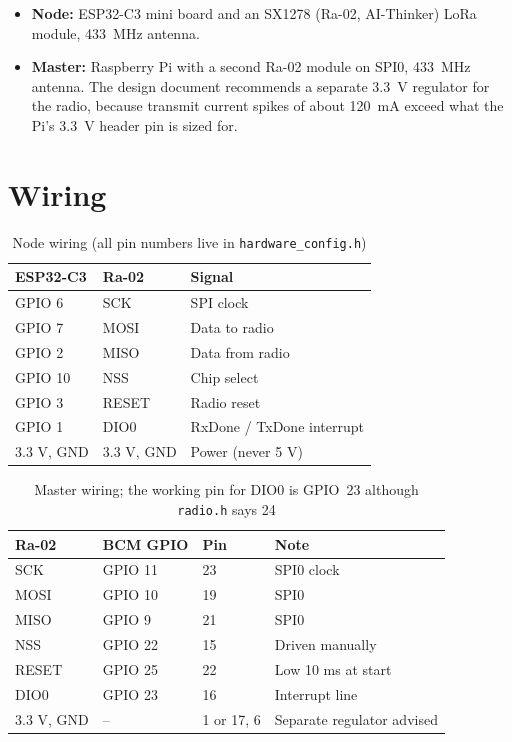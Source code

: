 \documentclass{tietreport}
\begin{document}
\begin{itemize}
  \item \textbf{Node:} ESP32-C3 mini board and an SX1278 (Ra-02,
    AI-Thinker) LoRa module, 433~MHz antenna.
  \item \textbf{Master:} Raspberry Pi with a second Ra-02 module on
    SPI0, 433~MHz antenna. The design document recommends a
    separate 3.3~V regulator for the radio, because transmit current
    spikes of about 120~mA exceed what the Pi's 3.3~V header pin is
    sized for.
\end{itemize}

\section{Wiring}

\begin{table}[h]
\centering
\small
\begin{tabular}{|l|l|l|}
  \hline
  \textbf{ESP32-C3} & \textbf{Ra-02} & \textbf{Signal} \\
  \hline
  GPIO 6 & SCK & SPI clock \\
  \hline
  GPIO 7 & MOSI & Data to radio \\
  \hline
  GPIO 2 & MISO & Data from radio \\
  \hline
  GPIO 10 & NSS & Chip select \\
  \hline
  GPIO 3 & RESET & Radio reset \\
  \hline
  GPIO 1 & DIO0 & RxDone / TxDone interrupt \\
  \hline
  3.3 V, GND & 3.3 V, GND & Power (never 5 V) \\
  \hline
\end{tabular}
\caption{Node wiring (all pin numbers live in \texttt{hardware\_config.h})}
\end{table}

\begin{table}[h]
\centering
\small
\begin{tabular}{|l|l|l|l|}
  \hline
  \textbf{Ra-02} & \textbf{BCM GPIO} & \textbf{Pin} & \textbf{Note} \\
  \hline
  SCK & GPIO 11 & 23 & SPI0 clock \\
  \hline
  MOSI & GPIO 10 & 19 & SPI0 \\
  \hline
  MISO & GPIO 9 & 21 & SPI0 \\
  \hline
  NSS & GPIO 22 & 15 & Driven manually \\
  \hline
  RESET & GPIO 25 & 22 & Low 10 ms at start \\
  \hline
  DIO0 & GPIO 23 & 16 & Interrupt line \\
  \hline
  3.3 V, GND & -- & 1 or 17, 6 & Separate regulator advised \\
  \hline
\end{tabular}
\caption{Master wiring; the working pin for DIO0 is GPIO~23 although
\texttt{radio.h} says 24}
\end{table}
\end{document}
